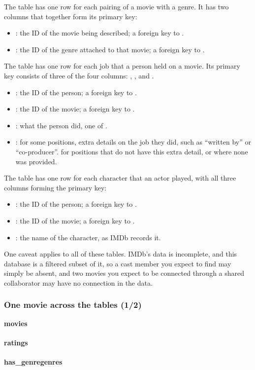 The  table has one row for each pairing of a movie with a genre.
It has two columns that together form its primary key:
\begin{itemize}
    \item {}: the ID of the movie being described; a foreign key to .
    \item {}: the ID of the genre attached to that movie; a foreign key to .
\end{itemize}
The  table has one row for each job that a person held on a movie.
Its primary key consists of three of the four columns: , , and .
\begin{itemize}
    \item {}: the ID of the person; a foreign key to .
    \item {}: the ID of the movie; a foreign key to .
    \item {}: what the person did, one of .
    \item {}: for some positions, extra details on the job they did, such as ``written by'' or ``co-producer''.
         for positions that do not have this extra detail, or where none was provided.
\end{itemize}
The  table has one row for each character that an actor played, with all three columns forming the primary key:
\begin{itemize}
    \item {}: the ID of the person; a foreign key to .
    \item {}: the ID of the movie; a foreign key to .
    \item {}: the name of the character, as IMDb records it.
\end{itemize}

One caveat applies to all of these tables.
IMDb's data is incomplete, and this database is a filtered subset of it, so a cast member you expect to find may simply be absent, and two movies you expect to be connected through a shared collaborator may have no connection in the data.

\begin{frame}[label=moviedb-kid1]
    \label{s:moviedb-kid1}
    \frametitle{One movie across the tables (1/2)}
    \footnotesize
    \textbf{movies}\\[0.2em]
    \\[1em]
    \textbf{ratings}\\[0.2em]
    \\[1em]
    \textbf{has\_genre}\hspace{2.655cm}\textbf{genres}\\[0.2em]
    \hspace{1em}%
    
\end{frame}
\label{l:moviedb-kid1}

